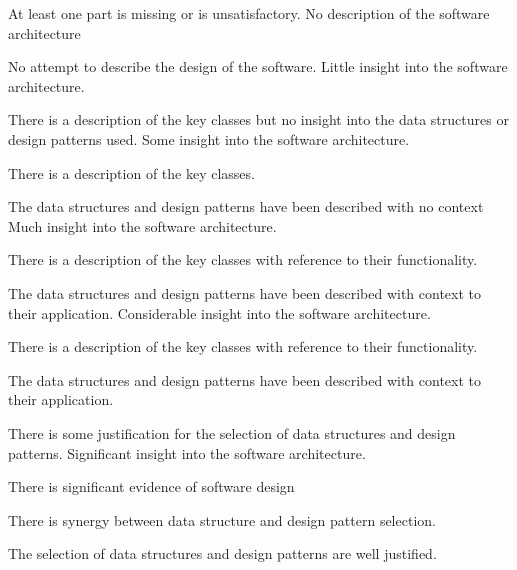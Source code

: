 \documentclass{../../fal_assignment}
\begin{document}
\rubricyeartwo
{}
\begin{markingrubric}
		\grade\fail At least one part is missing or is unsatisfactory.
%
	\grade\fail No description of the software architecture
	\par No attempt to describe the design of the software.
	\grade Little insight into the software architecture.
	\par There is a description of the key classes but no insight into the data structures or design patterns used.
	\grade Some insight into the software architecture.
	\par There is a description of the key classes.
	\par The data structures and design patterns have been described with no context
	\grade Much insight into the software architecture.
	\par There is a description of the key classes with reference to their functionality.
	\par The data structures and design patterns have been described with context to their application.
	\grade Considerable insight into the software architecture.
	\par There is a description of the key classes with reference to their functionality.
	\par The data structures and design patterns have been described with context to their application.
	\par There is some justification for the selection of data structures and design patterns.
	\grade Significant insight into the software architecture.
	\par There is significant evidence of software design
	\par There is synergy between data structure and design pattern selection.
	\par The selection of data structures and design patterns are well justified.

\end{markingrubric}
\end{document}
